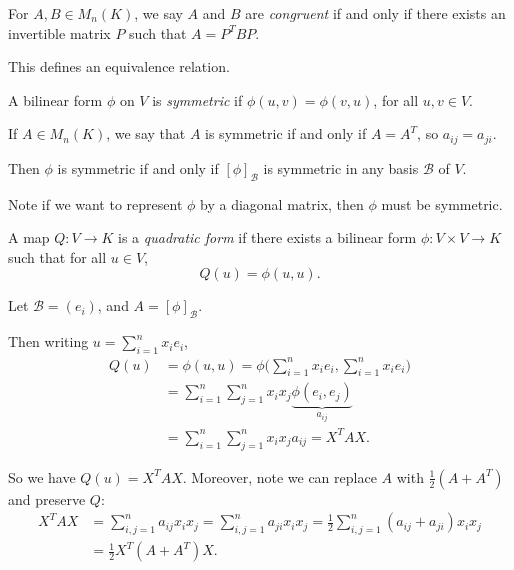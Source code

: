 \documentclass[12pt]{article}
\begin{document}
\begin{definition}
	For $A, B \in M_n(K)$, we say $A$ and $B$ are \textit{congruent} if and only if there exists an invertible matrix $P$ such that $A = P^{T}BP$.
\end{definition}
\begin{remark}
	This defines an equivalence relation.
\end{remark}

\begin{definition}
	A bilinear form $\phi$ on $V$ is \textit{symmetric} if $\phi(u, v) = \phi(v, u)$, for all $u, v \in V$.
\end{definition}
\begin{remark}
	If $A \in M_n(K)$, we say that $A$ is symmetric if and only if $A = A^{T}$, so $a_{ij} = a_{ji}$.

	Then $\phi$ is symmetric if and only if $[\phi]_{\mathcal{B}}$ is symmetric in any basis $\mathcal{B}$ of $V$.

	Note if we want to represent $\phi$ by a diagonal matrix, then $\phi$ must be symmetric.
\end{remark}

\begin{definition}
	A map $Q : V \to K$ is a \textit{quadratic form} if there exists a bilinear form $\phi : V \times V \to K$ such that for all $u \in V$,
	\[
		Q(u) = \phi(u, u)
	.\]
\end{definition}
\begin{remark}
	Let $\mathcal{B} = (e_i)$, and $A = [\phi]_{\mathcal{B}}$.

	Then writing $u = \sum_{i = 1}^{n} x_i e_i$,
	\begin{align*}
		Q(u) &= \phi(u, u) = \phi \Biggl( \sum_{i = 1}^{n} x_i e_i, \sum_{i = 1}^{n} x_i e_i \Biggr) \\
		     &= \sum_{i = 1}^{n} \sum_{j = 1}^{n} x_i x_j \underbrace{\phi(e_i, e_j)}_{a_{ij}} \\
		     &= \sum_{i = 1}^{n} \sum_{j = 1}^{n} x_i x_j a_{ij} = X^{T}AX.
	\end{align*}

	So we have $Q(u) = X^{T}AX$. Moreover, note we can replace $A$ with $\frac{1}{2}(A + A^{T})$ and preserve $Q$:
	\begin{align*}
		X^{T}AX &= \sum_{i,j = 1}^{n} a_{ij} x_i x_j = \sum_{i,j = 1}^{n} a_{ji}x_i x_j = \frac{1}{2} \sum_{i,j = 1}^{n} (a_{ij} + a_{ji})x_i x_j \\
			&= \frac{1}{2}X^{T}(A + A^{T})X.
	\end{align*}
\end{remark}
\end{document}
